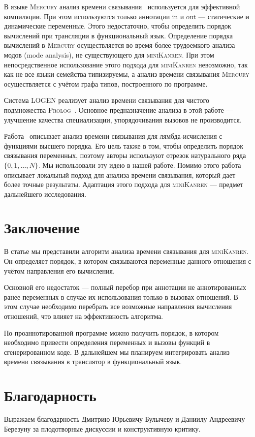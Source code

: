 \documentclass[conference,a4paper,american,russian]{IEEEtran}
\newcommand{\miniKanren}{\textsc{miniKanren}}
\newcommand{\mercury}{\textsc{Mercury}}
\newcommand{\prolog}{\textsc{Prolog}}
\newcommand{\logen}{\textsc{LOGEN}}
\begin{document}
В языке \mercury{} анализ времени связывания~\cite{vanhoof2004binding} используется для эффективной компиляции. 
При этом используются только аннотации in и out --- статические и динамические переменные. 
Этого недостаточно, чтобы определить порядок вычислений при трансляции в функциональный язык.
Определение порядка вычислений в \mercury{} осуществляется во время более трудоемкого анализа модов (mode analysis), не существующего для \miniKanren{}. 
При этом непосредственное использование этого подхода для \miniKanren{} невозможно, так как не все языки семейства типизируемы, а анализ времени связывания \mercury{} осуществляется с учётом графа типов, построенного по программе. 

Система \logen{} реализует анализ времени связывания для чистого подмножества \prolog{}~\cite{leuschel2004prolog}.
Основное предназначение анализа в этой работе --- улучшение качества специализации, упорядочивания вызовов не производится. 

Работа~\cite{Thiemann1997AUF} описывает анализ времени связывания для лямбда-исчисления с функциями высшего порядка. 
Его цель также в том, чтобы определить порядок связывания переменных, поэтому авторы используют отрезок натурального ряда $\{ 0, 1, \dots, N\}$. 
Мы использовали эту идею в нашей работе. 
Помимо этого работа~\cite{Thiemann1997AUF} описывает локальный подход для анализа времени связывания, который дает более точные результаты. 
Адаптация этого подхода для \miniKanren{} --- предмет дальнейшего исследования. 

\section{Заключение}\label{conclusion}

В статье мы представили алгоритм анализа времени связывания для \miniKanren{}. 
Он определяет порядок, в котором связываются переменные данного отношения с учётом направления его вычисления.  

Основной его недостаток --- полный перебор при аннотации не аннотированных ранее переменных в случае их использования только в вызовах отношений. 
В этом случае необходимо перебрать все возможные направления вычисления отношений, что влияет на эффективность алгоритма.

По проаннотированной программе можно получить порядок, в котором необходимо привести определения переменных и вызовы функций в сгенерированном коде. В дальнейшем мы планируем интегрировать анализ времени связывания в транслятор в функциональный язык. 

\section*{Благодарность}

Выражаем благодарность Дмитрию Юрьевичу Булычеву и Даниилу Андреевичу Березуну за плодотворные дискуссии и конструктивную критику.

\balance



\end{document}
